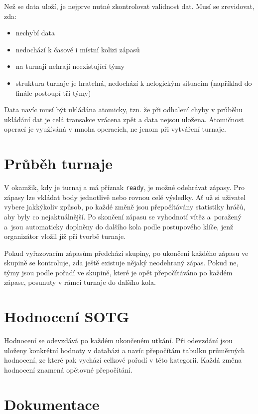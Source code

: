 Než se data uloží, je nejprve nutné zkontrolovat validnost dat. Musí se zrevidovat, zda: 

\begin{itemize}
 \item nechybí data
 \item nedochází k časové i místní kolizi zápasů
 \item na turnaji nehrají neexistující týmy
 \item struktura turnaje je hratelná, nedochází k nelogickým situacím (například do finále postoupí tři týmy)
\end{itemize}

Data navíc musí být ukládána atomicky, tzn. že při odhalení chyby v průběhu ukládání dat je celá transakce
vrácena zpět a data nejsou uložena. Atomičnost operací je využíváná v mnoha operacích,
ne jenom při vytváření turnaje.

\section{Průběh turnaje}

V okamžik, kdy je turnaj a má příznak \texttt{ready}, je možné odehrávat zápasy.
Pro zápasy lze vkládat body jednotlivě nebo rovnou celé výsledky.
Ať už si uživatel vybere jakkýkoliv způsob, po každé změně jsou přepočítávány
statistiky hráčů, aby byly co nejaktuálnější. Po skončení zápasu se vyhodnotí vítěz
a~poražený a~jsou automaticky doplněny do dalšího kola podle postupového klíče,
jenž organizátor vložil již při tvorbě turnaje.

Pokud vyřazovacím zápasům předchází skupiny, po ukončení každého zápasu ve skupině se kontroluje,
zda ještě existuje nějaký neodehraný zápas. Pokud ne, týmy jsou podle pořadí ve skupině, které je
opět přepočítáváno po každém zápase, posunuty v rámci turnaje do dalšího kola.


\section{Hodnocení SOTG}

Hodnocení se odevzdává po každém ukončeném utkání. Při odevzdání jsou uloženy konkrétní hodnoty
v databázi a navíc přepočítám tabulku průměrných hodnocení, ze které pak vychází celkové pořadí v této kategorii.
Každá změna hodnocení znamená opětovné přepočítání.

\section{Dokumentace}

